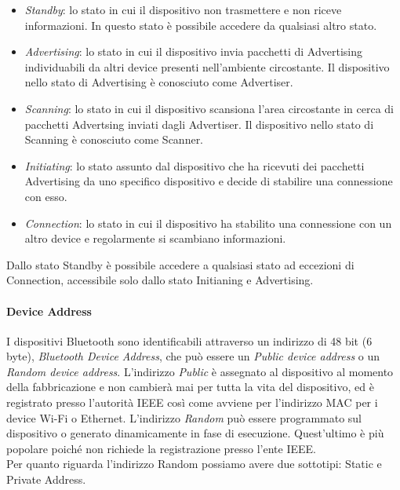 \begin{itemize}
    \item \textit{Standby}: lo stato in cui il dispositivo non trasmettere e non riceve informazioni. In questo stato è possibile accedere da qualsiasi altro stato.
    
    \item \textit{Advertising}: lo stato in cui il dispositivo invia pacchetti di Advertising individuabili da altri device presenti nell'ambiente circostante. Il dispositivo nello stato di Advertising è conosciuto come Advertiser.
    
    \item \textit{Scanning}: lo stato in cui il dispositivo scansiona l'area circostante in cerca di pacchetti Advertsing inviati dagli Advertiser. Il dispositivo nello stato di Scanning è conosciuto come Scanner.
    
    \item \textit{Initiating}: lo stato assunto dal dispositivo che ha ricevuti dei pacchetti Advertising da uno specifico dispositivo e decide di stabilire una connessione con esso.
    
    \item \textit{Connection}: lo stato in cui il dispositivo ha stabilito una connessione con un altro device e regolarmente si scambiano informazioni.
\end{itemize}

\noindent Dallo stato Standby è possibile accedere a qualsiasi stato ad eccezioni di Connection, accessibile solo dallo stato Initianing e Advertising.

\paragraph{Device Address}
I dispositivi Bluetooth sono identificabili attraverso un indirizzo di 48 bit (6 byte), \textit{Bluetooth Device Address}, che può essere un \textit{Public device address} o un \textit{Random device address}. 
L'indirizzo \textit{Public} è assegnato al dispositivo al momento della fabbricazione e non cambierà mai per tutta la vita del dispositivo, ed è registrato presso l'autorità IEEE così come avviene per l'indirizzo MAC per i device Wi-Fi o Ethernet. 
L'indirizzo \textit{Random} può essere programmato sul dispositivo o generato dinamicamente in fase di esecuzione. Quest'ultimo è più popolare poiché non richiede la registrazione presso l'ente IEEE.\\
Per quanto riguarda l'indirizzo Random possiamo avere due sottotipi: Static e Private Address.

